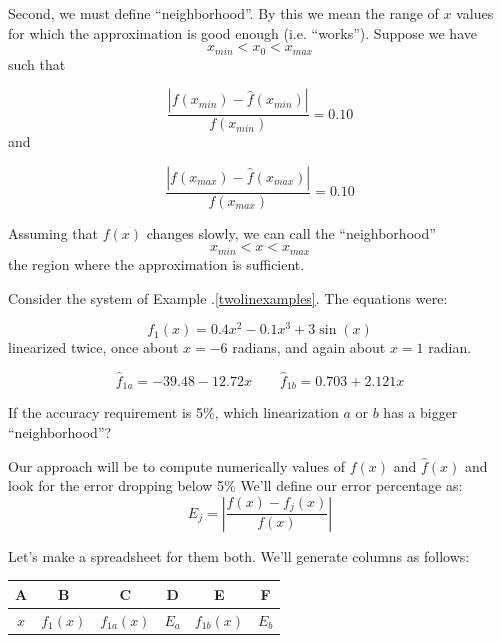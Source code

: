 Second, we must define ``neighborhood''.    By this we mean the range of $x$ values for which the approximation is good enough (i.e. ``works'').   Suppose we have
\[
x_{min} < x_0 < x_{max}
\]
such that

\[
\frac   {|f(x_{min})-\hat{f}(x_{min})| } {f(x_{min})} = 0.10
\]
and

\[
\frac   {|f(x_{max})-\hat{f}(x_{max})| } {f(x_{max})} = 0.10
\]

Assuming that $f(x)$ changes slowly, we can call the ``neighborhood''
\[
x_{min} < x < x_{max}
\]
the region where the approximation is sufficient.



\begin{Example}
Consider the system of Example \thechapter.\ref{twolinexamples}.  The equations were:

\[
f_1(x) = 0.4x^2 -0.1x^3 + 3\sin(x)
\]
 linearized twice, once about $x=-6$ radians, and again about $x=1$ radian.


\[
\hat{f}_{1a} =  -39.48-12.72x \qquad \hat{f}_{1b} =  0.703+2.121x
\]

If the accuracy requirement is 5\%, which linearization $a$ or $b$ has a bigger ``neighborhood''?


Our approach will be to compute numerically values of $f(x)$ and $\hat{f}(x)$ and look for the error dropping below 5\%
We'll define our error percentage as:
\[
E_j = \left| \frac {f(x) - f_j(x)} {f(x)}  \right |
\]

Let's make a spreadsheet for them both.  We'll generate columns as follows:

\begin{tabular}{|c|c|c|c|c|c|}\hline
A & B & C & D & E & F \\ \hline
$x$  & $f_1(x)$ & $f_{1a}(x) $  &  $E_a$ & $f_{1b}(x) $ &  $E_b$ \\
\hline
\end{tabular}



\end{Example}
